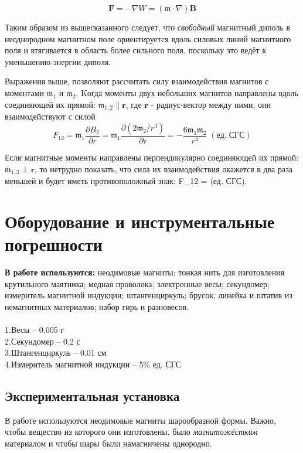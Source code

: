 \[\textbf{F} = -\nabla W = (\mathfrak{m} \cdot \nabla)\textbf{B}\]

Таким образом из вышесказанного следует, что \textit{свободный} магнитный диполь в неоднородном магнитном поле ориентируется вдоль силовых линий магнитного поля и втягивается в область более сильного поля, поскольку это ведёт к уменьшению энергии диполя.

Выражения выше, позволяют рассчитать силу взаимодействия магнитов с моментами $\mathfrak{m_1}$ и $\mathfrak{m_2}$. Kогда моменты двух небольших магнитов направлены вдоль соединяющей их прямой: $\mathfrak{m_{1,2}} \| \textbf{r}$, где $\textbf{r}$ - радиус-вектор между ними, они взаимодействуют с силой 
\[F_{12}= \mathfrak{m_1} \frac{\partial{B_2}}{\partial{r}} = \mathfrak{m_1}\frac{\partial{(2\mathfrak{m_2}/r^3)}}{\partial{r}} = -\frac{6 \mathfrak{m_1}\mathfrak{m_2}}{r^4} \;(ед.\; СГС) \]


Если магнитные моменты направлены перпендикулярно соединяющей их прямой: $\mathfrak{m_{1,2}} \perp \textbf{r}$, то нетрудно показать, что сила их взаимодействия окажется в два раза меньшей и будет иметь противоположный знак: $$F_{12} = \;(ед.\; СГС).
 



\section{Оборудование и инструментальные погрешности}

\noindent \textbf{В работе используются:} неодимовые магниты; тонкая нить для изготовления крутильного маятника; медная проволока; электронные весы; секундомер; измеритель магнитной индукции; штангенциркуль; брусок, линейка и штатив из немагнитных материалов; набор гирь и разновесов.\\
\\
1.Весы -- 0.005 г \\
2.Секундомер -- 0.2 с \\
3.Штангенциркуль -- 0.01 см \\
4.Измеритель магнитной индукции -- 5\% ед. СГС \\


 \subsection{Экспериментальная установка}

В работе используются неодимовые магниты шарообразной формы. Важно, чтобы вещество из которого они изготовлены, было \textit{магнитожёстким} материалом и чтобы шары были намагничены однородно.


